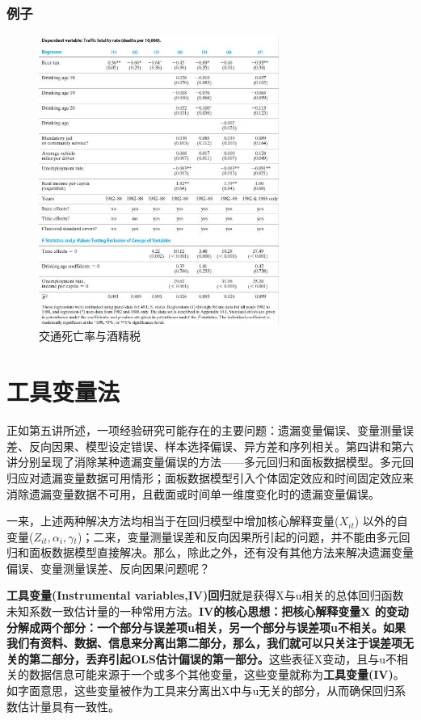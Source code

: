 \documentclass[cn,10pt,math=newtx,citestyle=gb7714-2015,bibstyle=gb7714-2015]{elegantbook}
\begin{document}
\subsection{例子}
\begin{figure}[htbp]
	\centering
	\includegraphics[width=0.7\textwidth]{results.jpg}
	\caption{交通死亡率与酒精税}\label{fig:digit}
\end{figure}
	
	\chapter{工具变量法}
	正如第五讲所述，一项经验研究可能存在的主要问题：遗漏变量偏误、变量测量误差、反向因果、模型设定错误、样本选择偏误、异方差和序列相关。第四讲和第六讲分别呈现了消除某种遗漏变量偏误的方法——多元回归和面板数据模型。多元回归应对遗漏变量数据可用情形；面板数据模型引入个体固定效应和时间固定效应来消除遗漏变量数据不可用，且截面或时间单一维度变化时的遗漏变量偏误。
	
	一来，上述两种解决方法均相当于在回归模型中增加核心解释变量($X_{it}$) 以外的自变量($Z_{it},\alpha{_i},\gamma{_t}$)；二来，变量测量误差和反向因果所引起的问题，并不能由多元回归和面板数据模型直接解决。那么，除此之外，还有没有其他方法来解决遗漏变量偏误、变量测量误差、反向因果问题呢？
	
	\textbf{工具变量(Instrumental variables,IV)回归}就是获得X与u相关的总体回归函数未知系数一致估计量的一种常用方法。\textbf{IV的核心思想：把核心解释变量X 的变动分解成两个部分：一个部分与误差项u相关，另一个部分与误差项u不相关。如果我们有资料、数据、信息来分离出第二部分，那么，我们就可以只关注于误差项无关的第二部分，丢弃引起OLS估计偏误的第一部分。}这些表征X变动，且与u不相关的数据信息可能来源于一个或多个其他变量，这些变量就称为\textbf{工具变量(IV)}。 如字面意思，这些变量被作为工具来分离出X中与u无关的部分，从而确保回归系数估计量具有一致性。
	
\end{document}
